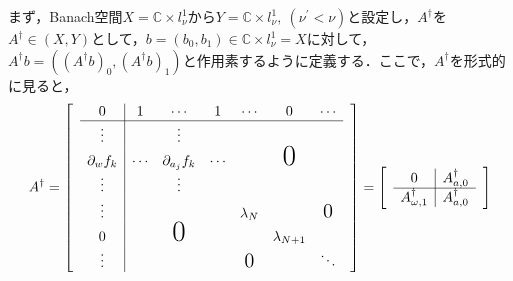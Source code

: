 \begin{dfn}
  まず，Banach空間$X=\mathbb{C}\times l_\nu^1$から$Y=\mathbb{C}\times l_\nu^1,\ (\nu^\prime<\nu)$と設定し，$A^\dagger$を$A^\dagger\in (X,Y)$として，$b=(b_0,b_1)\in \mathbb{C}\times l_\nu^1=X$に対して，$A^\dagger b=\left(\left(A^\dagger b\right)_0,\left(A^\dagger b\right)_1\right)$と作用素するように定義する．ここで，$A^\dagger$を形式的に見ると，
  \begin{equation*}
    A^\dagger =
    \begin{bmatrix}
       & \multicolumn{1}{c|}{0}              & 1      & \cdots            & 1      & \cdots           & 0               & \cdots           & \\ \cline{2-8}
       & \multicolumn{1}{c|}{\vdots}         &        & \vdots            &        &                  &                 &                  & \\
       & \multicolumn{1}{c|}{\partial_w f_k} & \cdots & \partial_{a_j}f_k & \cdots &                  & \text{\huge{0}} &                    \\
       & \multicolumn{1}{c|}{\vdots}         &        & \vdots            &        &                  &                 &                    \\
       & \multicolumn{1}{c|}{\vdots}         &        &                   &        & \lambda_N        &                 & \text{\Large{0}} & \\
       & \multicolumn{1}{c|}{0}              &        & \text{\huge{0}}   &        &                  & \lambda_{N+1}   &                    \\
       & \multicolumn{1}{c|}{\vdots}         &        &                   &        & \text{\Large{0}} &                 & \ddots
    \end{bmatrix}
    =
    \begin{bmatrix}
       & \multicolumn{1}{c|}{0}                    & A_{a,0}^\dagger & \\ \cline{2-3}
       & \multicolumn{1}{c|}{A_{\omega,1}^\dagger} & A_{a,0}^\dagger &
    \end{bmatrix}
  \end{equation*}


\end{dfn}
